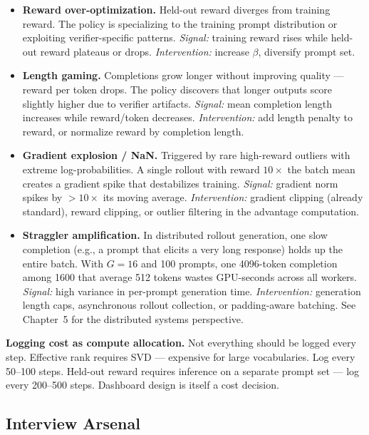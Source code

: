 \begin{itemize}
  \item \textbf{Reward over-optimization.} Held-out reward diverges from training reward. The policy is specializing to the training prompt distribution or exploiting verifier-specific patterns. \textit{Signal:} training reward rises while held-out reward plateaus or drops. \textit{Intervention:} increase $\beta$, diversify prompt set.

  \item \textbf{Length gaming.} Completions grow longer without improving quality --- reward per token drops. The policy discovers that longer outputs score slightly higher due to verifier artifacts. \textit{Signal:} mean completion length increases while reward/token decreases. \textit{Intervention:} add length penalty to reward, or normalize reward by completion length.

  \item \textbf{Gradient explosion / NaN.} Triggered by rare high-reward outliers with extreme log-probabilities. A single rollout with reward $10\times$ the batch mean creates a gradient spike that destabilizes training. \textit{Signal:} gradient norm spikes by $> 10\times$ its moving average. \textit{Intervention:} gradient clipping (already standard), reward clipping, or outlier filtering in the advantage computation.

  \item \textbf{Straggler amplification.} In distributed rollout generation, one slow completion (e.g., a prompt that elicits a very long response) holds up the entire batch. With $G = 16$ and 100 prompts, one 4096-token completion among 1600 that average 512 tokens wastes GPU-seconds across all workers. \textit{Signal:} high variance in per-prompt generation time. \textit{Intervention:} generation length caps, asynchronous rollout collection, or padding-aware batching. See Chapter~5 for the distributed systems perspective.
\end{itemize}

\textbf{Logging cost as compute allocation.} Not everything should be logged every step. Effective rank requires SVD --- expensive for large vocabularies. Log every 50--100 steps. Held-out reward requires inference on a separate prompt set --- log every 200--500 steps. Dashboard design is itself a cost decision.

\subsection{Interview Arsenal}

